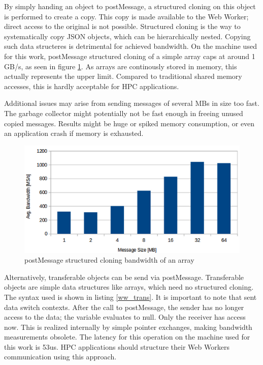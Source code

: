 By simply handing an object to postMessage, a structured cloning on this object is performed to create a copy. This copy is made available to the Web Worker; direct access to the original is not possible. Structured cloning is the way to systematically copy JSON objects, which can be hierarchically nested. Copying such data structeres is detrimental for achieved bandwidth. On the machine used for this work, postMessage structured cloning of a simple array caps at around 1 GB/s, as seen in figure \ref{fig:ww_bw}. As arrays are continously stored in memory, this actually represents the upper limit. Compared to traditional shared memory accesses, this is hardly acceptable for HPC applications.

Additional issues may arise from sending messages of several MBs in size too fast. The garbage collector might potentially not be fast enough in freeing unused copied messages. Results might be huge or spiked memory consumption, or even an application crash if memory is exhausted.

\begin{figure}[htp]
  \begin{center}
    \includegraphics[width=0.9\columnwidth]{resources/ww_bw.png}
  \end{center}
  \caption{postMessage structured cloning bandwidth of an array}
  \label{fig:ww_bw}
\end{figure}

Alternatively, transferable objects can be send via postMessage. Transferable objects are simple data structures like arrays, which need no structured cloning. The syntax used is shown in listing \ref{ww_trans}. It is important to note that sent data switch contexts. After the call to postMessage, the sender has no longer access to the data; the variable evaluates to null. Only the receiver has access now. This is realized internally by simple pointer exchanges, making bandwidth measurements obsolete. The latency for this operation on the machine used for this work is 53us. HPC applications should structure their Web Workers communication using this approach.

